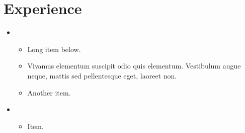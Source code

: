 \section{Experience}

\begin{itemize}
	\item {

		\begin{itemize}
			\item Long item below.
			\item Vivamus elementum suscipit odio quis elementum. Vestibulum augue neque, mattis sed pellentesque eget, laoreet non.
			\item Another item.
		\end{itemize}
	}
	\item {
		
		\begin{itemize}
			\item Item.
		\end{itemize}
	}
\end{itemize}
